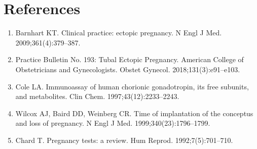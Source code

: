 \section*{References}
\begin{enumerate}
  \item Barnhart KT. Clinical practice: ectopic pregnancy. N Engl J Med. 2009;361(4):379--387.
  \item Practice Bulletin No. 193: Tubal Ectopic Pregnancy. American College of Obstetricians and Gynecologists. Obstet Gynecol. 2018;131(3):e91--e103.
  \item Cole LA. Immunoassay of human chorionic gonadotropin, its free subunits, and metabolites. Clin Chem. 1997;43(12):2233--2243.
  \item Wilcox AJ, Baird DD, Weinberg CR. Time of implantation of the conceptus and loss of pregnancy. N Engl J Med. 1999;340(23):1796--1799.
  \item Chard T. Pregnancy tests: a review. Hum Reprod. 1992;7(5):701--710.
\end{enumerate}
\clearpage
